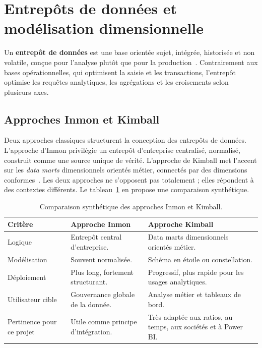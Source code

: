 \section{Entrepôts de données et modélisation dimensionnelle}
\label{sec:dw}
\par Un \textbf{entrepôt de données} est une base orientée sujet, intégrée,
historisée et non volatile, conçue pour l'analyse plutôt que pour la
production~\cite{inmon2005}. Contrairement aux bases opérationnelles, qui
optimisent la saisie et les transactions, l'entrepôt optimise les requêtes
analytiques, les agrégations et les croisements selon plusieurs axes.

\subsection{Approches Inmon et Kimball}
\par Deux approches classiques structurent la conception des entrepôts de
données. L'approche d'Inmon privilégie un entrepôt d'entreprise centralisé,
normalisé, construit comme une source unique de vérité. L'approche de Kimball
met l'accent sur les \textit{data marts} dimensionnels orientés métier,
connectés par des dimensions conformes~\cite{kimball2013}. Les deux approches ne
s'opposent pas totalement ; elles répondent à des contextes différents. Le
tableau~\ref{tab:inmonkimball} en propose une comparaison synthétique.

\begin{table}[H]
\centering
\caption[Comparaison Inmon et Kimball]{Comparaison synthétique des approches Inmon et Kimball.}
\label{tab:inmonkimball}
\begin{tabularx}{\linewidth}{|p{3cm}|X|X|}
\hline
\textbf{Critère} & \textbf{Approche Inmon} & \textbf{Approche Kimball} \\ \hline
Logique & Entrepôt central d'entreprise. & Data marts dimensionnels orientés métier. \\ \hline
Modélisation & Souvent normalisée. & Schéma en étoile ou constellation. \\ \hline
Déploiement & Plus long, fortement structurant. & Progressif, plus rapide pour les usages analytiques. \\ \hline
Utilisateur cible & Gouvernance globale de la donnée. & Analyse métier et tableaux de bord. \\ \hline
Pertinence pour ce projet & Utile comme principe d'intégration. & Très adaptée aux ratios, au temps, aux sociétés et à Power BI. \\ \hline
\end{tabularx}
\end{table}

